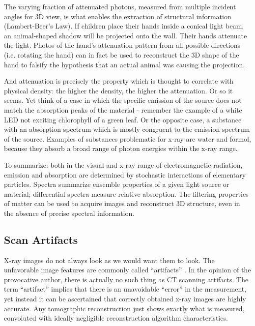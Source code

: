The varying fraction of attenuated photons, measured from multiple incident angles for 3D view, is what enables the extraction of structural information (Lambert-Beer's Law).
If children place their hands inside a conical light beam, an animal-shaped shadow will be projected onto the wall.
Their hands attenuate the light.
Photos of the hand's attenuation pattern from all possible directions (i.e. rotating the hand) can in fact be used to reconstruct the 3D shape of the hand to falsify the hypothesis that an actual animal was causing the projection.

And attenuation is precisely the property which is thought to correlate with physical density: the higher the density, the higher the attenuation.
Or so it seems.
Yet think of a case in which the specific emission of the source does not match the absorption peaks of the material - remember the example of a white LED not exciting chlorophyll of a green leaf.
Or the opposite case, a substance with an absorption spectrum which is mostly congruent to the emission spectrum of the source.
Examples of substances problematic for x-ray are water and formol, because they absorb a broad range of photon energies within the x-ray range.


To summarize: both in the visual and x-ray range of electromagnetic radiation, emission and absorption are determined by stochastic interactions of elementary particles.
Spectra summarize ensemble properties of a given light source or material; differential spectra measure relative absorption.
The filtering properties of matter can be used to acquire images and reconstruct 3D structure, even in the absence of precise spectral information.


\subsection{Scan Artifacts}
\label{sec:org268dfa7}
X-ray images do not always look as we would want them to look.
The unfavorable image features are commonly called ``artifacts'' \citep{Triche2019}.
In the opinion of the provocative author, there is actually no such thing as CT scanning artifacts.
The term ``artifact'' implies that there is an unavoidable ``error'' in the measurement, yet instead it can be ascertained that correctly obtained x-ray images are highly accurate.
Any tomographic reconstruction just shows exactly what is measured, convoluted with ideally negligible reconstruction algorithm characteristics.


